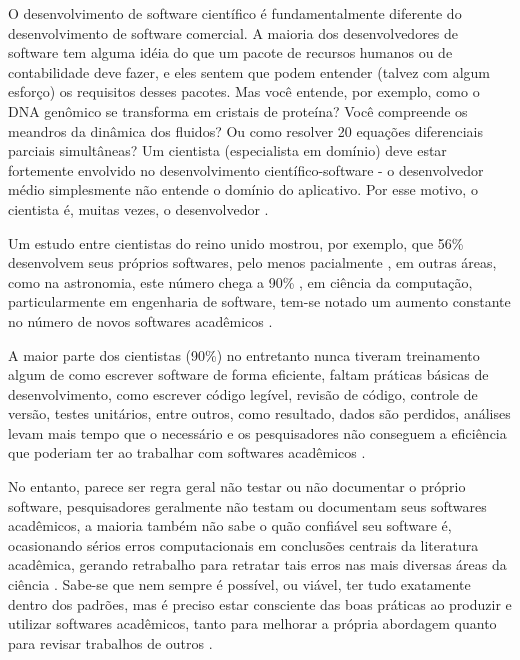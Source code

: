 O desenvolvimento de software científico é fundamentalmente diferente do
desenvolvimento de software comercial. A maioria dos desenvolvedores de
software tem alguma idéia do que um pacote de recursos humanos ou de
contabilidade deve fazer, e eles sentem que podem entender (talvez com algum
esforço) os requisitos desses pacotes. Mas você entende, por exemplo, como o
DNA genômico se transforma em cristais de proteína? Você compreende os meandros
da dinâmica dos fluidos? Ou como resolver 20 equações diferenciais parciais
simultâneas? Um cientista (especialista em domínio) deve estar fortemente
envolvido no desenvolvimento científico-software - o desenvolvedor médio
simplesmente não entende o domínio do aplicativo. Por esse motivo, o cientista
é, muitas vezes, o desenvolvedor \cite{segal2008developing}.

Um estudo entre cientistas do reino unido mostrou, por exemplo, que 56\%
desenvolvem seus próprios softwares, pelo menos pacialmente
\cite{hettrick_2014_14809}, em outras áreas, como na astronomia, este número
chega a 90\% \cite{momcheva2015software}, em ciência da computação,
particularmente em engenharia de software, tem-se notado um aumento constante
no número de novos softwares acadêmicos \cite{allen2017engineering}.


A maior parte dos cientistas (90\%) no entretanto nunca tiveram treinamento
algum de como escrever software de forma eficiente, faltam práticas básicas de
desenvolvimento, como escrever código legível, revisão de código, controle de
versão, testes unitários, entre outros, como resultado, dados são perdidos,
análises levam mais tempo que o necessário e os pesquisadores não conseguem a
eficiência que poderiam ter ao trabalhar com softwares acadêmicos
\cite{wilson2017good}.

No entanto, parece ser regra geral não testar ou não documentar o próprio software,
pesquisadores geralmente não testam ou documentam seus softwares acadêmicos, a
maioria também não sabe o quão confiável seu software é, ocasionando sérios
erros computacionais em conclusões centrais da literatura acadêmica, gerando
retrabalho para retratar tais erros nas mais diversas áreas da ciência
\cite{Merali2010Computational}. Sabe-se que nem sempre é possível, ou viável,
ter tudo exatamente dentro dos padrões, mas é preciso estar consciente das boas
práticas ao produzir e utilizar softwares acadêmicos, tanto para melhorar a
própria abordagem quanto para revisar trabalhos de outros
\cite{wilson2014best}.

